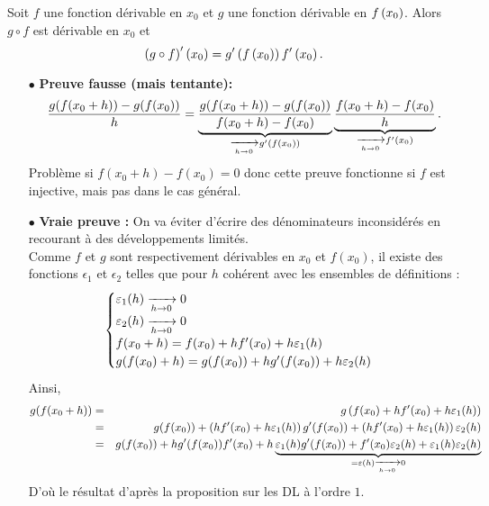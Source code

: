\documentclass{magnoliaold}
\begin{document}
\begin{proposition}[utile=-3]
Soit $f$ une fonction dérivable en $x_0$ et $g$ une fonction dérivable en
$f\left(x_0\right)$. Alors $g\circ f$ est dérivable en $x_0$ et
\[\left(g\circ f\right)'\left(x_0\right)=g'\left(f\left(x_0\right)\right)f'\left(x_0\right).\]
\end{proposition}

\begin{preuve}
\begin{itemize}
\item[$\bullet$] \textbf{Preuve fausse (mais tentante):}
$$\frac{g(f(x_0+h))-g(f(x_0))}{h}=\underbrace{\frac{g(f(x_0+h))-g(f(x_0))}{f(x_0+h)-f(x_0)}}_{\xrightarrow[h\rightarrow 0]{}g'(f(x_0))}\underbrace{\frac{f(x_0+h)-f(x_0)}{h}}_{\xrightarrow[h\rightarrow 0]{}f'(x_0)}.$$
Problème si $f(x_0+h)-f(x_0)=0$ donc cette preuve fonctionne si $f$ est injective, mais pas dans le cas général.
\item[$\bullet$] \textbf{Vraie preuve :} On va éviter d'écrire des dénominateurs inconsidérés en recourant à des développements limités. \\
Comme $f$ et $g$ sont respectivement dérivables en $x_0$ et $f(x_0)$, il existe des fonctions $\epsilon_1$ et $\epsilon_2$ telles que pour $h$ cohérent avec les ensembles de définitions :
$$\begin{cases}
\varepsilon_1(h)\xrightarrow[h\rightarrow 0]{}0\\
\varepsilon_2(h)\xrightarrow[h\rightarrow 0]{}0\\
f(x_0+h)=f(x_0)+hf'(x_0)+h\varepsilon_1(h)\\
g(f(x_0)+h)=g(f(x_0))+hg'(f(x_0))+h\varepsilon_2(h)
\end{cases}$$
Ainsi, 
\begin{eqnarray*}
g(f(x_0+h))&=&g\left(f(x_0)+hf'(x_0)+h\varepsilon_1(h)\right)\\
&=&g(f(x_0))+\left(hf'(x_0)+h\varepsilon_1(h)\right)g'(f(x_0))+\left(hf'(x_0)+h\varepsilon_1(h)\right)\varepsilon_2(h)\\
&=&g(f(x_0))+hg'(f(x_0))f'(x_0)+h\underbrace{\varepsilon_1(h)g'(f(x_0))+f'(x_0)\varepsilon_2(h)+\varepsilon_1(h)\varepsilon_2(h)}_{=\varepsilon(h)\xrightarrow[h\rightarrow 0]{}0}
\end{eqnarray*}
D'où le résultat d'après la proposition sur les DL à l'ordre $1$.

\end{itemize}

\end{preuve}

\end{document}
